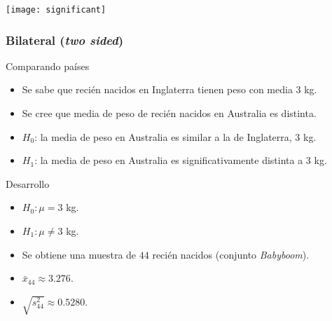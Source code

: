 \documentclass[table]{beamer}
\begin{document}
\begin{frame}
    \begin{center}
        \texttt{[image: significant]}
    \end{center}
\end{frame}

\begin{frame}
    \frametitle{Bilateral (\emph{two sided})}
    \begin{exampleblock}{Comparando países}
        \begin{itemize}
            \item Se sabe que recién nacidos en Inglaterra tienen peso con media $3$ kg.
            \item Se cree que media de peso de recién nacidos en Australia es distinta.
            \item $H_{0}$: la media de peso en Australia es similar a la de Inglaterra, $3$ kg.
            \item $H_{1}$: la media de peso en Australia es significativamente distinta a $3$ kg.
        \end{itemize}
    \end{exampleblock}

\end{frame}

\begin{frame}
    \begin{block}{Desarrollo}
        \begin{itemize}
            \item $H_{0}: \mu = 3$ kg.
            \item $H_{1}: \mu \neq 3$ kg.
            \item Se obtiene una muestra de $44$ recién nacidos (conjunto \emph{Babyboom}).
            \item $\bar{x}_{44} \approx 3.276$.
            \item $\sqrt{s^{2}_{44}} \approx 0.5280$.
        \end{itemize}
    \end{block}
\end{frame}
\end{document}
